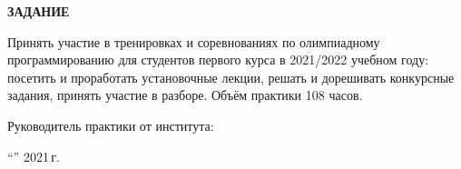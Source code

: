 \begin{center}
\bfseries{\large ЗАДАНИЕ}
\end{center}

Принять участие в тренировках и соревнованиях по олимпиадному программированию для студентов первого курса в 2021/2022 учебном году: посетить и проработать установочные лекции, решать и дорешивать конкурсные задания, принять участие в разборе. Объём практики 108 часов.

\vspace*{\fill}
Руководитель практики от института:

\vspace{5pt}
\enquote{\hspace{0.5cm}}  2021\,г.\hfill {}
\pagebreak
